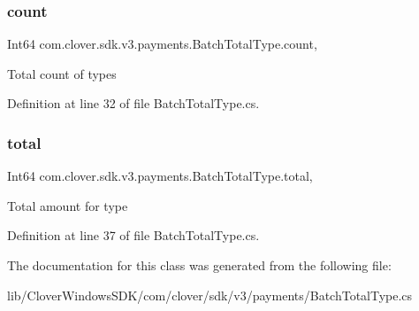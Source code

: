 \subsubsection{\texorpdfstring{count}{count}}
{\footnotesize\ttfamily Int64 com.\+clover.\+sdk.\+v3.\+payments.\+Batch\+Total\+Type.\+count\hspace{0.3cm}{\ttfamily [get]}, {\ttfamily [set]}}



Total count of types 



Definition at line 32 of file Batch\+Total\+Type.\+cs.

\mbox{\label{classcom_1_1clover_1_1sdk_1_1v3_1_1payments_1_1_batch_total_type_aa1fbbae3f87aa1c20b15cab3e1e03dd7}} 
\subsubsection{\texorpdfstring{total}{total}}
{\footnotesize\ttfamily Int64 com.\+clover.\+sdk.\+v3.\+payments.\+Batch\+Total\+Type.\+total\hspace{0.3cm}{\ttfamily [get]}, {\ttfamily [set]}}



Total amount for type 



Definition at line 37 of file Batch\+Total\+Type.\+cs.



The documentation for this class was generated from the following file\+:\begin{DoxyCompactItemize}
\item 
lib/\+Clover\+Windows\+S\+D\+K/com/clover/sdk/v3/payments/Batch\+Total\+Type.\+cs\end{DoxyCompactItemize}
